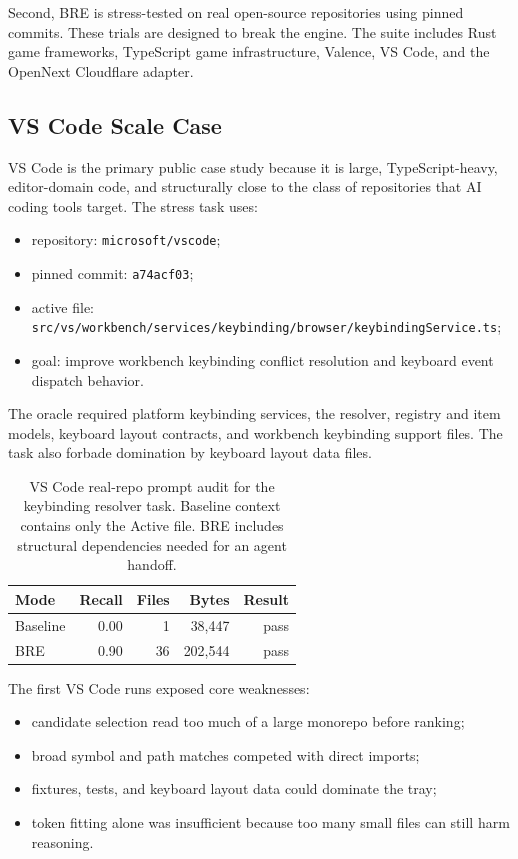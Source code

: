 \documentclass[10pt,twocolumn,letterpaper]{article}
\begin{document}
Second, BRE is stress-tested on real open-source repositories using pinned commits. These trials are designed to break the engine. The suite includes Rust game frameworks, TypeScript game infrastructure, Valence, VS Code, and the OpenNext Cloudflare adapter.

\subsection{VS Code Scale Case}
VS Code is the primary public case study because it is large, TypeScript-heavy, editor-domain code, and structurally close to the class of repositories that AI coding tools target. The stress task uses:
\begin{itemize}
    \item repository: \texttt{microsoft/vscode};
    \item pinned commit: \texttt{a74acf03};
    \item active file: \texttt{src/vs/workbench/services/keybinding/browser/keybindingService.ts};
    \item goal: improve workbench keybinding conflict resolution and keyboard event dispatch behavior.
\end{itemize}

The oracle required platform keybinding services, the resolver, registry and item models, keyboard layout contracts, and workbench keybinding support files. The task also forbade domination by keyboard layout data files.

\begin{table}[h]
\centering
\begin{tabular}{lrrrr}
\toprule
Mode & Recall & Files & Bytes & Result \\
\midrule
Baseline & 0.00 & 1 & 38,447 & pass \\
BRE & 0.90 & 36 & 202,544 & pass \\
\bottomrule
\end{tabular}
\caption{VS Code real-repo prompt audit for the keybinding resolver task. Baseline context contains only the Active file. BRE includes structural dependencies needed for an agent handoff.}
\end{table}

The first VS Code runs exposed core weaknesses:
\begin{itemize}
    \item candidate selection read too much of a large monorepo before ranking;
    \item broad symbol and path matches competed with direct imports;
    \item fixtures, tests, and keyboard layout data could dominate the tray;
    \item token fitting alone was insufficient because too many small files can still harm reasoning.
\end{itemize}
\end{document}
